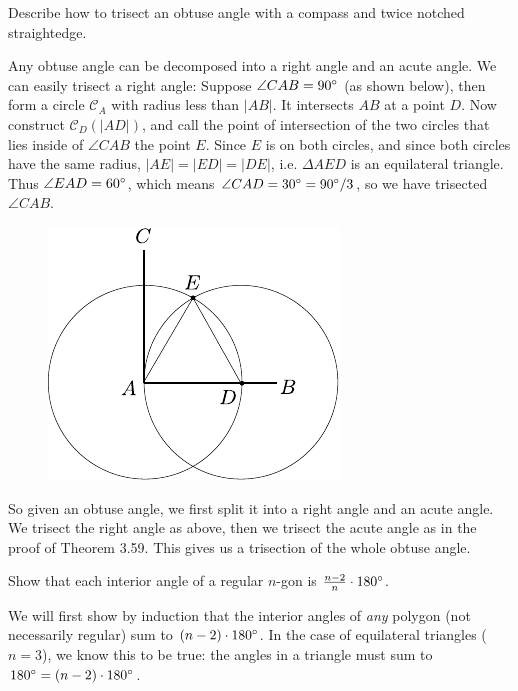 \documentclass[twoside,10pt]{article}
\begin{document}

\begin{exer}[3.60]
	Describe how to trisect an obtuse angle with a compass and twice notched straightedge.
\end{exer}

Any obtuse angle can be decomposed into a right angle and an acute angle. We can easily trisect a right angle: Suppose $\angle CAB = 90^\circ$ (as shown below), then form a circle $\mathcal{C}_{A}$ with radius less than $|AB|$. It intersects $AB$ at a point $D$. Now construct $\mathcal{C}_{D}(|AD|)$, and call the point of intersection of the two circles that lies inside of $\angle CAB$ the point $E$. Since $E$ is on both circles, and since both circles have the same radius, $|AE|=|ED|=|DE|$, i.e. $\Delta AED$ is an equilateral triangle. Thus $\angle EAD = 60^\circ$, which means $\angle CAD = 30^\circ = 90^\circ /3$, so we have trisected $\angle CAB$.

\begin{figure}[H]
	\centering
	\includegraphics[scale=1]{fig/60.pdf}
\end{figure}

So given an obtuse angle, we first split it into a right angle and an acute angle. We trisect the right angle as above, then we trisect the acute angle as in the proof of Theorem 3.59. This gives us a trisection of the whole obtuse angle.

\newpage

\begin{exer}[5.3]
Show that each interior angle of a regular $n$-gon is $\frac{n-2}{n} \cdot 180^\circ$.
\end{exer}

We will first show by induction that the interior angles of \textit{any} polygon (not necessarily regular) sum to $(n-2)\cdot 180^\circ$. In the case of equilateral triangles ($n=3$), we know this to be true: the angles in a triangle must sum to $180^\circ = (n-2) \cdot 180^\circ$.
\end{document}
